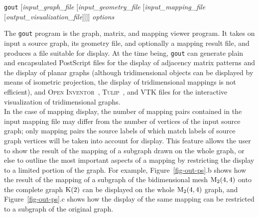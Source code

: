 \begin{itemize}
\progsyn
\texttt{gout} [{\it input\_graph\_file} [{\it input\_geometry\_file} [{\it input\_\lbt mapping\_\lbt file} [{\it output\_\lbt visualization\_\lbt file}]]]] {\it options}

\progdes
The \texttt{gout} program is the graph, matrix, and mapping viewer program. It
takes on input a source graph, its geometry file, and optionally a mapping
result file, and produces a file suitable for display.
At the time being, \texttt{gout} can generate plain and encapsulated PostScript
files for the display of adjacency matrix patterns and the
display of planar graphs (although tridimensional objects
can be displayed by means of isometric projection, the display of
tridimensional mappings is not efficient), and
\textsc{Open Inventor}~\cite{oinv}, \textsc{Tulip}~\cite{tulip}, and
\textsc{VTK} files for the interactive visualization of tridimensional
graphs.
\\
In the case of mapping display,
the number of mapping pairs contained in the input mapping file may
differ from the number of vertices of the input source graph;
only mapping pairs the source labels of which match labels of source graph
vertices will be taken into account for display.
This feature allows the user to show the result of the mapping of a subgraph
drawn on the whole graph, or else to outline the most important aspects
of a mapping by restricting the display to a limited portion of the graph.
For example, Figure~\ref{fig-out-ps}\@.b shows how the result of the mapping of
a subgraph of the bidimensional mesh ${\rm M}_{2}(4,4)$ onto the complete graph
${\rm K}(2)$ can be displayed on the whole ${\rm M}_{2}(4,4)$ graph,
and Figure~\ref{fig-out-ps}\@.c shows how the display of the same mapping
can be restricted to a subgraph of the original graph.
\begin{figure}[hbt]
\hfill
\parbox[t]{4.5cm}{
\hfill
}
\end{figure}
\end{itemize}

